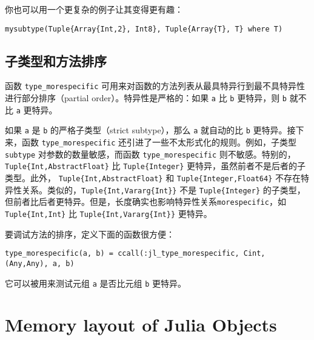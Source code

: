 你也可以用一个更复杂的例子让其变得更有趣：




\begin{verbatim}
mysubtype(Tuple{Array{Int,2}, Int8}, Tuple{Array{T}, T} where T)
\end{verbatim}



\hypertarget{197922126248734429}{}


\subsection{子类型和方法排序}



函数 \texttt{type\_morespecific} 可用来对函数的方法列表从最具特异行到最不具特异性进行部分排序（partial order）。特异性是严格的：如果 \texttt{a} 比 \texttt{b} 更特异，则 \texttt{b} 就不比 \texttt{a} 更特异。



如果 \texttt{a} 是 \texttt{b} 的严格子类型（strict subtype），那么 \texttt{a} 就自动的比 \texttt{b} 更特异。接下来，函数 \texttt{type\_morespecific} 还引进了一些不太形式化的规则。例如，子类型 \texttt{subtype} 对参数的数量敏感，而函数 \texttt{type\_morespecific} 则不敏感。特别的，\texttt{Tuple\{Int,AbstractFloat\}} 比 \texttt{Tuple\{Integer\}} 更特异，虽然前者不是后者的子类型。此外， \texttt{Tuple\{Int,AbstractFloat\}} 和 \texttt{Tuple\{Integer,Float64\}} 不存在特异性关系。类似的，\texttt{Tuple\{Int,Vararg\{Int\}\}} 不是 \texttt{Tuple\{Integer\}} 的子类型，但前者比后者更特异。但是，长度确实也影响特异性关系\texttt{morespecific}，如 \texttt{Tuple\{Int,Int\}} 比 \texttt{Tuple\{Int,Vararg\{Int\}\}} 更特异。



要调试方法的排序，定义下面的函数很方便：




\begin{verbatim}
type_morespecific(a, b) = ccall(:jl_type_morespecific, Cint, (Any,Any), a, b)
\end{verbatim}



它可以被用来测试元组 \texttt{a} 是否比元组 \texttt{b} 更特异。



\hypertarget{5831288113328207392}{}


\section{Memory layout of Julia Objects}




